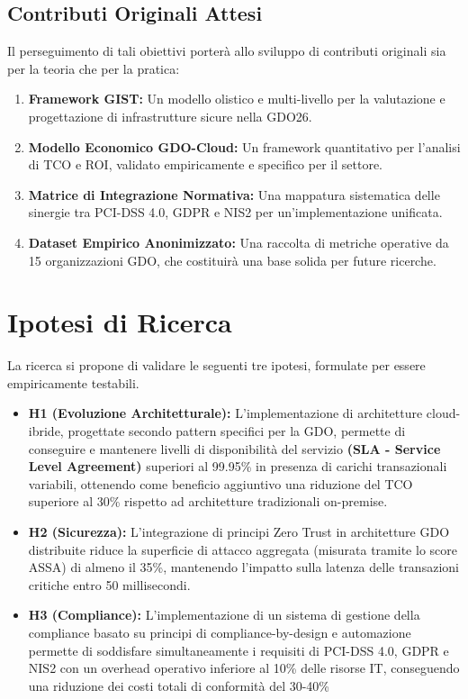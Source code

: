 \begin{refsection}
\begin{itemize}
\end{itemize}
\subsection{Contributi Originali Attesi}
Il perseguimento di tali obiettivi porterà allo sviluppo di contributi originali sia per la teoria che per la pratica:
\begin{enumerate}
    \item \textbf{Framework GIST:} Un modello olistico e multi-livello per la valutazione e progettazione di infrastrutture sicure nella GDO26.
    \item \textbf{Modello Economico GDO-Cloud:} Un framework quantitativo per l'analisi di TCO e ROI, validato empiricamente e specifico per il settore.
    \item \textbf{Matrice di Integrazione Normativa:} Una mappatura sistematica delle sinergie tra PCI-DSS 4.0, GDPR e NIS2 per un'implementazione unificata.
    \item \textbf{Dataset Empirico Anonimizzato:} Una raccolta di metriche operative da 15 organizzazioni GDO, che costituirà una base solida per future ricerche.
\end{enumerate}



\section{Ipotesi di Ricerca}
La ricerca si propone di validare le seguenti tre ipotesi, formulate per essere empiricamente testabili.
\begin{itemize}
    \item \textbf{H1 (Evoluzione Architetturale):} L'implementazione di architetture cloud-ibride, progettate secondo pattern specifici per la GDO, permette di conseguire e mantenere livelli di disponibilità del servizio \textbf{(SLA - Service Level Agreement)} superiori al 99.95\% in presenza di carichi transazionali variabili, ottenendo come beneficio aggiuntivo una riduzione del TCO superiore al 30\% rispetto ad architetture tradizionali on-premise.
    \item \textbf{H2 (Sicurezza):} L'integrazione di principi Zero Trust in architetture GDO distribuite riduce la superficie di attacco aggregata (misurata tramite lo score ASSA) di almeno il 35\%, mantenendo l'impatto sulla latenza delle transazioni critiche entro 50 millisecondi.
    \item \textbf{H3 (Compliance):} L'implementazione di un sistema di gestione della compliance basato su principi di compliance-by-design e automazione permette di soddisfare simultaneamente i requisiti di PCI-DSS 4.0, GDPR e NIS2 con un overhead operativo inferiore al 10\% delle risorse IT, conseguendo una riduzione dei costi totali di conformità del 30-40\%
\end{itemize}

\end{refsection}
